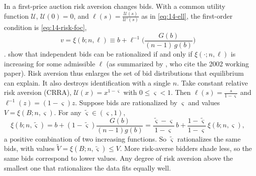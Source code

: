 In a first-price auction risk aversion changes bids. With a common utility function $\mathcal U$,
$\mathcal U(0)=0$, and $\ell(s)=\frac{\mathcal U(s)}{\mathcal U'(s)}$ as in \eqref{eq:14-ell}, the
first-order condition is \eqref{eq:14-risk-foc},
\begin{equation}\label{eq:15-risk-foc}
v=\xi(b;n,\ell)\equiv b+\ell^{-1}\Big(\frac{G(b)}{(n-1)\,g(b)}\Big)
\end{equation}
\citep[eqs. (6.24)--(6.25)]{AtheyHaile2007}. \citet{CampoEtAl2011} show that independent bids can be
rationalized if and only if $\xi(\cdot;n,\ell)$ is increasing for some admissible $\ell$ (as summarized
by \citealp[Section 6.4.1]{AtheyHaile2007}, who cite the 2002 working paper). Risk aversion
thus enlarges the set of bid distributions that equilibrium can explain. It also destroys identification
with a single $n$. Take constant relative risk aversion (CRRA), $\mathcal U(x)=x^{1-\varsigma}$ with
$0\le\varsigma<1$. Then $\ell(s)=\frac{s}{1-\varsigma}$ and $\ell^{-1}(z)=(1-\varsigma)z$. Suppose bids are
rationalized by $\varsigma$ and values $V=\xi(B;n,\varsigma)$. For any $\tilde\varsigma\in(\varsigma,1)$,
\[
\xi(b;n,\tilde\varsigma)=b+(1-\tilde\varsigma)\frac{G(b)}{(n-1)g(b)}
=\frac{\tilde\varsigma-\varsigma}{1-\varsigma}\,b+\frac{1-\tilde\varsigma}{1-\varsigma}\,\xi(b;n,\varsigma),
\]
a positive combination of two increasing functions. So $\tilde\varsigma$ rationalizes the same bids, with
values $\tilde V=\xi(B;n,\tilde\varsigma)\le V$. More risk-averse bidders shade less, so the same bids
correspond to lower values. Any degree of risk aversion above the smallest one that rationalizes the data
fits equally well.

